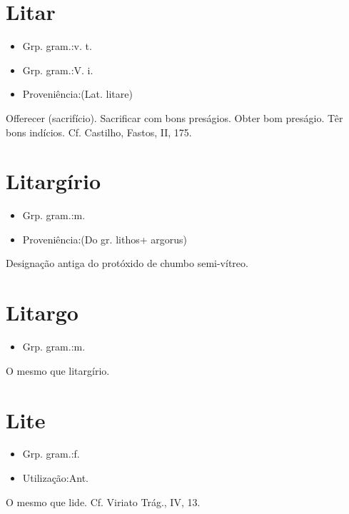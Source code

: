 \section{Litar}
\begin{itemize}
\item {Grp. gram.:v. t.}
\end{itemize}
\begin{itemize}
\item {Grp. gram.:V. i.}
\end{itemize}
\begin{itemize}
\item {Proveniência:(Lat. \textunderscore litare\textunderscore )}
\end{itemize}
Offerecer (sacrifício).
Sacrificar com bons preságios.
Obter bom preságio.
Têr bons indícios. Cf. Castilho, \textunderscore Fastos\textunderscore , II, 175.
\section{Litargírio}
\begin{itemize}
\item {Grp. gram.:m.}
\end{itemize}
\begin{itemize}
\item {Proveniência:(Do gr. \textunderscore lithos\textunderscore  + \textunderscore argorus\textunderscore )}
\end{itemize}
Designação antiga do protóxido de chumbo semi-vítreo.
\section{Litargo}
\begin{itemize}
\item {Grp. gram.:m.}
\end{itemize}
O mesmo que \textunderscore litargírio\textunderscore .
\section{Lite}
\begin{itemize}
\item {Grp. gram.:f.}
\end{itemize}
\begin{itemize}
\item {Utilização:Ant.}
\end{itemize}
O mesmo que \textunderscore lide\textunderscore . Cf. \textunderscore Viriato Trág.\textunderscore , IV, 13.
